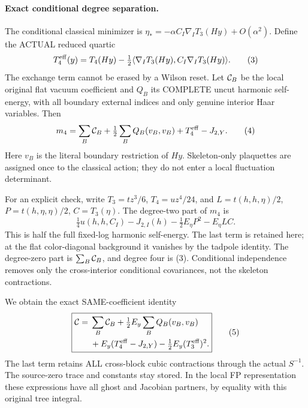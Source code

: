 \documentclass[11pt]{article}
\begin{document}
\paragraph{Exact conditional degree separation.}
The conditional classical minimizer is
$\eta_*=-\alpha C_I\nabla_I T_3(Hy)+O(\alpha^2)$. Define the ACTUAL
reduced quartic
\[
 T_4^{\rm eff}(y)=T_4(Hy)-\tfrac12
 \langle\nabla_I T_3(Hy),C_I\nabla_I T_3(Hy)\rangle . \tag{3}
\]
The exchange term cannot be erased by a Wilson reset.
Let ${\cal C}_B$ be the local original flat vacuum coefficient and
$Q_B$ its COMPLETE uncut harmonic self-energy, with all boundary
external indices and only genuine interior Haar variables. Then
\[
 m_4=\sum_B{\cal C}_B+\tfrac12\sum_B Q_B(v_B,v_B)
                        +T_4^{\rm eff}-J_{2,Y}. \tag{4}
\]
Here $v_B$ is the literal boundary restriction of $Hy$. Skeleton-only
plaquettes are assigned once to the classical action; they do not
enter a local fluctuation determinant.

For an explicit check, write $T_3=t z^3/6$, $T_4=u z^4/24$, and
$L=t(h,h,\eta)/2$, $P=t(h,\eta,\eta)/2$, $C=T_3(\eta)$.
The degree-two part of $m_4$ is
\[
 \tfrac14 u(h,h,C_I)-J_{2,I}(h)
                      -\tfrac12E_\eta P^2-E_\eta LC.
\]
This is half the full fixed-log harmonic self-energy. The last term
is retained here; at the flat color-diagonal background it vanishes
by the tadpole identity. The degree-zero part is $\sum_B{\cal C}_B$,
and degree four is (3). Conditional independence removes only the
cross-interior conditional covariances, not the skeleton contractions.

We obtain the exact SAME-coefficient identity
\[
 \boxed{\begin{split}
 {\cal C}={}&\sum_B{\cal C}_B+\tfrac12 E_y\sum_B Q_B(v_B,v_B)\\
 &+E_y(T_4^{\rm eff}-J_{2,Y})-\tfrac12 E_y(T_3^{\rm eff})^2 .
 \end{split}} \tag{5}
\]
The last term retains ALL cross-block cubic contractions through the
actual $S^{-1}$. The source-zero trace and constants stay stored.
In the local FP representation these expressions have all ghost and
Jacobian partners, by equality with this original tree integral.
\end{document}
